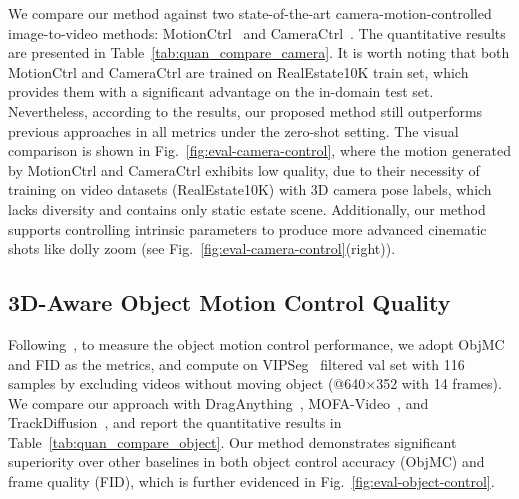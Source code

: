We compare our method against two state-of-the-art camera-motion-controlled image-to-video methods: MotionCtrl~\cite{wang2024motionctrl} and CameraCtrl~\cite{he2024cameractrl}. The quantitative results are presented in Table~\ref{tab:quan_compare_camera}. It is worth noting that both MotionCtrl and CameraCtrl are trained on RealEstate10K train set, which provides them with a significant advantage on the in-domain test set.
Nevertheless, according to the results, our proposed method still outperforms previous approaches in all metrics under the zero-shot setting. 
The visual comparison is shown in Fig.~\ref{fig:eval-camera-control}, where the motion generated by MotionCtrl and CameraCtrl exhibits low quality, due to their necessity of training on video datasets (RealEstate10K) with 3D camera pose labels, which lacks diversity and contains only static estate scene. Additionally, our method supports controlling intrinsic parameters to produce more advanced cinematic shots like dolly zoom (see Fig.~\ref{fig:eval-camera-control}(right)).







\subsection{3D-Aware Object Motion Control Quality}
Following~\cite{wu2025draganything,wang2024motionctrl}, to measure the object motion control performance, we adopt ObjMC and FID as the metrics, and compute on
VIPSeg~\cite{miao2022large} filtered val set with 116 samples by excluding videos without moving object (@640$\times$352 with 14 frames). We compare our approach with DragAnything~\cite{wu2025draganything}, MOFA-Video~\cite{niu2025mofa}, and TrackDiffusion~\cite{li2023trackdiffusion}, and report the quantitative results in Table~\ref{tab:quan_compare_object}.
Our method demonstrates significant superiority over other baselines in both object control accuracy (ObjMC) and frame quality (FID), which is further evidenced in Fig.~\ref{fig:eval-object-control}. 


